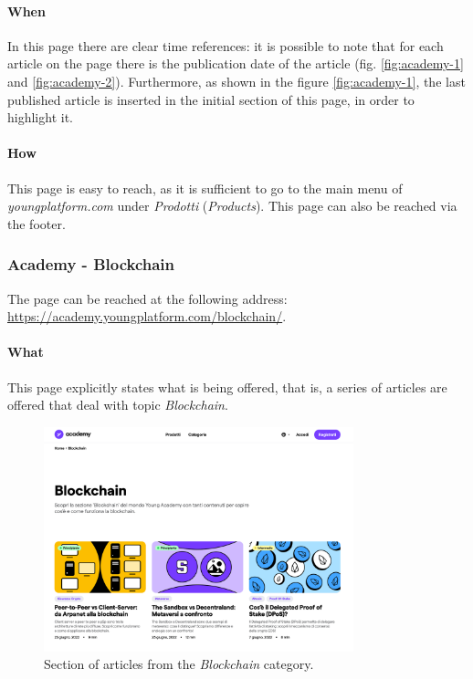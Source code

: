 \paragraph{When}

In this page there are clear time references: it is possible to note that 
for each article on the page there is the publication date of the article 
(fig. \ref{fig:academy-1} and \ref{fig:academy-2}). Furthermore, as shown 
in the figure \ref{fig:academy-1}, the last published article is inserted 
in the initial section of this page, in order to highlight it.

\paragraph{How}

This page is easy to reach, as it is sufficient to go to the main menu of 
\textit{youngplatform.com} under \textit{Prodotti} (\textit{Products}). 
This page can also be reached via the footer.

\newpage

\subsubsection{Academy - Blockchain}

The page can be reached at the following address: 
\href{https://academy.youngplatform.com/blockchain/}{https://academy.youngplatform.com/blockchain/}. 

\paragraph{What}

This page explicitly states what is being offered, that is, a series of 
articles are offered that deal with topic \textit{Blockchain}. 

\begin{figure}[H]
  \centering
  \includegraphics[width=0.80\textwidth]{res/images/internal-pages/academy/academy-3.png}
  \caption{Section of articles from the \textit{Blockchain} category.}
  \label{fig:academy-3}
\end{figure}

